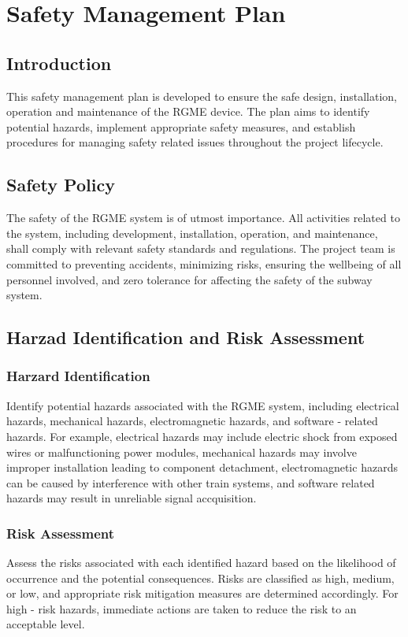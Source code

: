 \documentclass{article}
\begin{document}
\section{Safety Management Plan}
\subsection{Introduction}
This safety management plan is developed to ensure the safe design, installation, operation and maintenance of the RGME device. The plan aims to identify potential hazards, implement appropriate safety measures, and establish procedures for managing safety related issues throughout the project lifecycle.
\subsection{Safety Policy}
The safety of the RGME system is of utmost importance. All activities related to the system, including development, installation, operation, and maintenance, shall comply with relevant safety standards and regulations. The project team is committed to preventing accidents, minimizing risks, ensuring the wellbeing of all personnel involved, and zero tolerance for affecting the safety of the subway system.
\subsection{Harzad Identification and Risk Assessment}
\subsubsection{Harzard Identification}
Identify potential hazards associated with the RGME system, including electrical hazards, mechanical hazards, electromagnetic hazards, and software - related hazards. For example, electrical hazards may include electric shock from exposed wires or malfunctioning power modules, mechanical hazards may involve improper installation leading to component detachment, electromagnetic hazards can be caused by interference with other train systems, and software related hazards may result in unreliable signal accquisition.
\subsubsection{Risk Assessment}
Assess the risks associated with each identified hazard based on the likelihood of occurrence and the potential consequences. Risks are classified as high, medium, or low, and appropriate risk mitigation measures are determined accordingly. For high - risk hazards, immediate actions are taken to reduce the risk to an acceptable level.
\end{document}
